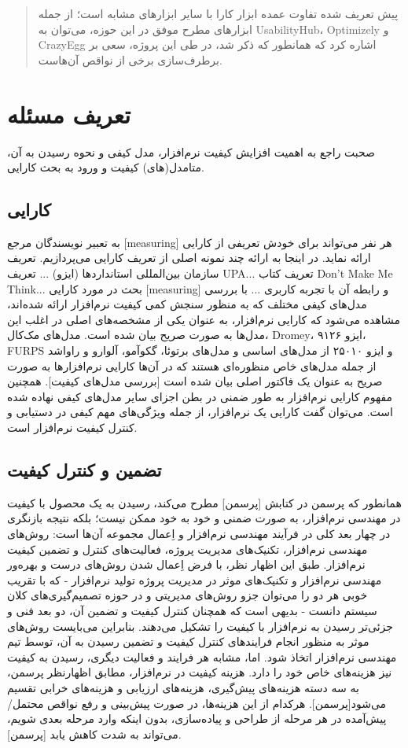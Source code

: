 \documentclass{report}
\theoremstyle{definition}
\begin{document}
\begin{abstract}
پیش تعریف شده تفاوت عمده ابزار کارا با سایر ابزارهای مشابه است؛ از جمله ابزارهای مطرح موفق در این حوزه، می‌توان به UsabilityHub، Optimizely و CrazyEgg اشاره کرد که همانطور که ذکر شد، در طی این پروژه، سعی بر برطرف‌سازی برخی از نواقص آن‌هاست.
	\end{abstract}
	\newpage
	\tableofcontents
	\newpage
	\chapter{تعریف مسئله}
صحبت راجع به اهمیت افزایش کیفیت نرم‌افزار، مدل کیفی و نحوه رسیدن به آن، متامدل(های) کیفیت و ورود به بحث کارایی.
	\section{کارایی}
به تعبیر نویسندگان مرجع [measuring] هر نفر می‌تواند برای خودش تعریفی از کارایی ارائه نماید. در اینجا به ارائه چند نمونه اصلی از تعریف کارایی می‌پردازیم.
تعریف سازمان بین‌المللی استانداردها (ایزو) ...
تعریف UPA...
تعریف کتاب Don’t Make Me Think...
بحث در مورد کارایی [measuring] و رابطه آن با تجربه کاربری ...
با بررسی مدل‌های کیفی مختلف که به منظور سنجش کمی کیفیت نرم‌افزار ارائه شده‌اند، مشاهده می‌شود که کارایی نرم‌افزار، به عنوان یکی از مشخصه‌های اصلی در اغلب این مدل‌ها به صورت صریح  بیان شده است. مدل‌های مک‌کال، Dromey، ایزو ۹۱۲۶، FURPS و ایزو ۲۵۰۱۰ از مدل‌های اساسی و مدل‌های برتوئا، گکوآمو، آلوارو و راواشد از جمله مدل‌های خاص منظوره‌ای هستند که در آن‌ها کارایی نرم‌افزارها به صورت صریح به عنوان یک فاکتور اصلی بیان شده است [بررسی مدل‌های کیفیت]. همچنین مفهوم کارایی نرم‌افزار به طور ضمنی در بطن اجزای سایر مدل‌های کیفی نهاده شده است. می‌توان گفت کارایی یک نرم‌افزار، از جمله ویژگی‌های مهم کیفی در دستیابی و کنترل کیفیت نرم‌افزار است.
	\section{تضمین و کنترل کیفیت}
همانطور که پرسمن در کتابش [پرسمن] مطرح می‌کند، رسیدن به یک محصول با کیفیت در مهندسی نرم‌افزار، به صورت ضمنی و خود به خود ممکن نیست؛ بلکه نتیجه بازنگری در چهار بعد کلی در فرآیند مهندسی نرم‌افزار و اِعمال مجموعه آن‌ها است: روش‌های مهندسی نرم‌افزار، تکنیک‌های مدیریت پروژه، فعالیت‌های کنترل و تضمین کیفیت نرم‌افزار. طبق این اظهار نظر، با فرض اِعمال شدن روش‌های درست و بهره‌ور مهندسی نرم‌افزار و تکنیک‌های موثر در مدیریت پروژه تولید نرم‌افزار - که با تقریب خوبی هر دو را می‌توان جزو روش‌های مدیریتی و در حوزه تصمیم‌گیری‌های کلان سیستم دانست - بدیهی است که همچنان کنترل کیفیت و تضمین آن، دو بعد فنی و جزئی‌تر رسیدن به نرم‌افزار با کیفیت را تشکیل می‌دهند. بنابراین می‌بایست روش‌های موثر به منظور انجام فرایند‌های کنترل کیفیت و تضمین رسیدن به آن، توسط تیم مهندسی نرم‌افزار اتخاذ شود.
اما، مشابه هر فرایند و فعالیت دیگری، رسیدن به کیفیت نیز هزینه‌های خاص خود را دارد. هزینه کیفیت در نرم‌افزار، مطابق اظهارنظر پرسمن، به سه دسته هزینه‌های پیش‌گیری، هزینه‌های ارزیابی و هزینه‌های خرابی تقسیم می‌شود[پرسمن]. هرکدام از این هزینه‌ها، در صورت پیش‌بینی و رفع نواقص محتمل/پیش‌آمده در هر مرحله از طراحی و پیاده‌سازی، بدون اینکه وارد مرحله بعدی شویم، می‌تواند به شدت کاهش یابد [پرسمن].
\end{document}
